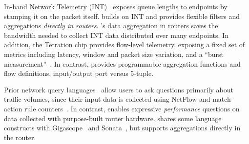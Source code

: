 
%

In-band Network Telemetry (INT)~\cite{int, tpp} exposes queue lengths to
endpoints by stamping it on the packet itself. \TheSystem builds on INT and
provides flexible filters and aggregations {\em directly in routers}.
\TheSystem's data aggregation in routers saves the bandwidth needed to collect
INT data distributed over many endpoints.  In addition, the Tetration chip
provides flow-level telemetry, exposing a fixed set of metrics including
latency, window and packet size variation, and a ``burst
measurement''~\cite{tetration-telemetry}. In contrast, \TheSystem provides
programmable aggregation functions and flow definitions, \eg input/output port versus 5-tuple.

 Prior network query languages~\cite{gigascope,
frenetic, path_query, streaming-monitoring} allow users to ask questions
primarily about traffic volumes, since their input data is
collected using NetFlow and match-action rule counters~\cite{openflow}. In
contrast, \TheSystem enables expressive {\em performance} questions on
data collected with purpose-built router hardware. \TheSystem shares some
language constructs with Gigascope~\cite{gigascope} and
Sonata~\cite{streaming-monitoring}, but supports aggregations directly in the
router.

